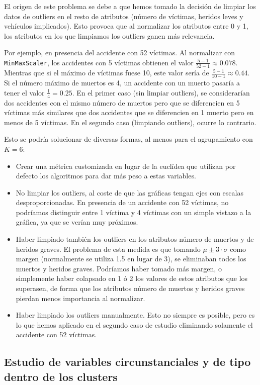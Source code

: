 \documentclass[oneside]{book}
\begin{document}
El origen de este problema se debe a que hemos tomado la decisión de
limpiar los datos de outliers en el resto de atributos (número de
víctimas, heridos leves y vehículos implicados). Esto provoca que al
normalizar los atributos entre 0 y 1, los atributos en los que
limpiamos los outliers ganen más relevancia.

Por ejemplo, en presencia del accidente con 52 víctimas. Al normalizar
con \texttt{MinMaxScaler}, los accidentes con 5 víctimas obtienen el
valor $\frac{5-1}{52-1}\approx 0.078$. Mientras que si el máximo de
víctimas fuese 10, este valor sería de $\frac{5-1}{10-1}\approx
0.44$. Si el número máximo de muertos es 4, un accidente con un muerto
pasaría a tener el valor $\frac{1}{4}=0.25$. En el primer caso (sin
limpiar outliers), se considerarían dos accidentes con el mismo número
de muertos pero que se diferencien en 5 víctimas más similares que dos
accidentes que se diferencien en 1 muerto pero en menos de 5
víctimas. En el segundo caso (limpiando outliers), ocurre lo
contrario.

Esto se podría solucionar de diversas formas, al menos para el
agrupamiento con $K=6$:
\begin{itemize}
\item Crear una métrica customizada en lugar de la euclídea que
  utilizan por defecto los algoritmos para dar más peso a estas
  variables.
\item No limpiar los outliers, al coste de que las gráficas tengan
  ejes con escalas desproporcionadas. En presencia de un accidente con
  52 víctimas, no podríamos distinguir entre 1 víctima y 4 víctimas
  con un simple vistazo a la gráfica, ya que se verían muy próximos.
\item Haber limpiado también los outliers en los atributos número de
  muertos y de heridos graves. El problema de esta medida es que
  tomando $\mu\pm 3\cdot\sigma$ como margen (normalmente se utiliza
  1.5 en lugar de 3), se eliminaban todos los muertos y heridos
  graves. Podríamos haber tomado más margen, o simplemente haber
  colapsado en 1 ó 2 los valores de estos atributos que los superasen,
  de forma que los atributos número de muertos y heridos graves
  pierdan menos importancia al normalizar.
\item Haber limpiado los outliers manualmente. Esto no siempre es
  posible, pero es lo que hemos aplicado en el segundo caso de estudio
  eliminando solamente el accidente con 52 víctimas.
\end{itemize}

\subsection{Estudio de variables circunstanciales y de tipo dentro de
  los clusters}
\end{document}
